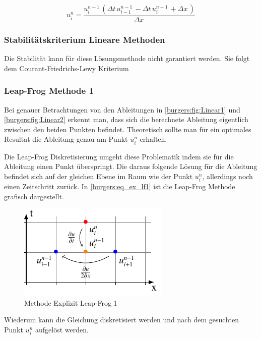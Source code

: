 	\begin{equation}
		u_{i}^{n} = \frac{u^{n-1}_{i}\, \left(\Delta{t}\, u^{n-1}_{i-1}\, - \Delta{t}\, u^{n-1}_{i}\, + \Delta{x}\,\right)}{\Delta{x}\,}
    	\label{burgers:eq_ex_sol_lin2}
	\end{equation}
	
\subsubsection{Stabilit\"atskriterium Lineare Methoden}
	Die Stabilit\"at kann f\"ur diese L\"osungsmethode nicht garantiert werden.
	Sie folgt dem Courant-Friedrichs-Lewy Kriterium
	
	
\subsubsection{Leap-Frog Methode 1}
	
	Bei genauer Betrachtungen von den Ableitungen in \ref{burgers:fig:Linear1} und \ref{burgers:fig:Linear2} erkennt man, dass sich die berechnete Ableitung eigentlich zwischen den beiden Punkten befindet.
	Theoretisch sollte man für ein optimales Resultat die Ableitung genau am Punkt $u_{i}^{n}$ erhalten.
	
	\medskip
	Die Leap-Frog Diskretisierung umgeht diese Problematik indem sie f\"ur die Ableitung einen Punkt \"uberspringt.
	Die daraus folgende L\"osung für die Ableitung befindet sich auf der gleichen Ebene im Raum wie der Punkt $u_{i}^{n}$, allerdings noch einen Zeitschritt zurück.
	In \ref{burgers:eq_ex_lf1} ist die Leap-Frog Methode grafisch dargestellt.
	
	
	\begin{figure}[!ht]
	\centering
	\includegraphics[height=.4\textwidth]{papers/burgers/BurgersEquation/tikz/Linear3/Linear3.pdf}
	\caption{Methode Explizit Leap-Frog 1}
	\label{burgers:fig:Linear3}
	\end{figure}
	
	Wiederum kann die Gleichung diskretisiert werden und nach dem gesuchten Punkt $u_{i}^{n}$ aufgel\"ost werden.
	
